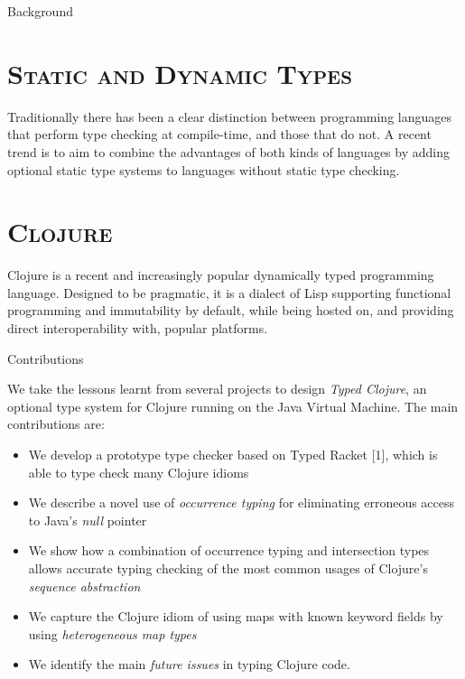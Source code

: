 \documentclass[landscape,final,a0paper,fontscale=0.277]{baposter}
\begin{document}
\begin{poster}
  \begin{posterbox}[name=problem,column=0,row=0]{Background}

\section*{\textsc{Static and Dynamic Types}}

Traditionally there has been a clear distinction between 
programming languages that perform type checking at compile-time, and those that do not.
A recent trend is to aim to combine the advantages of both kinds of languages by adding optional static 
type systems to languages without static type checking.

\section*{\textsc{Clojure}}

Clojure is a recent and increasingly popular dynamically typed programming language.
Designed to be pragmatic, it is a dialect of Lisp supporting functional programming and immutability by default,
while being hosted on, and providing direct interoperability with, popular platforms.
\end{posterbox}

\begin{posterbox}[name=contribution,column=0,below=problem]{Contributions}

We take the lessons learnt from several projects to design \emph{Typed Clojure},
an optional type system for Clojure running on the Java Virtual Machine. 
The main contributions are:
\begin{itemize}
  \item We develop a prototype type checker based on Typed Racket [1], which is able to type check many Clojure idioms
  \item We describe a novel use of \emph{occurrence typing} for eliminating erroneous access to Java's \emph{null} pointer
  \item We show how a combination of occurrence typing and intersection types allows accurate typing checking of
        the most common usages of Clojure's \emph{sequence abstraction} 
  \item We capture the Clojure idiom of using maps with known keyword fields by using \emph{heterogeneous map types}
  \item We identify the main \emph{future issues} in typing Clojure code.


\end{itemize}
\end{posterbox}
\end{poster}
\end{document}
